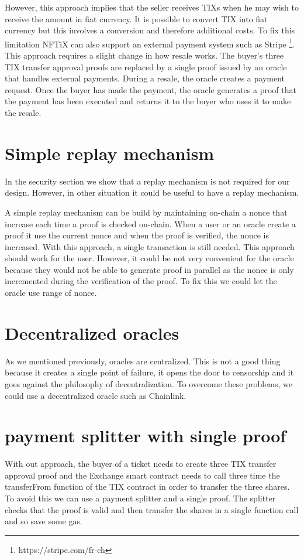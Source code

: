 \documentclass[a4paper,11pt,oneside]{report}
\begin{document}
However, this approach implies that the seller receives TIXs when he may wish to receive the amount in fiat currency. It is possible to convert TIX into fiat currency but this involves a conversion and therefore additional costs. To fix this limitation NFTiX can also support an external payment system such as Stripe \footnote{https://stripe.com/fr-ch}. This approach requires a slight change in how resale works. The buyer's three TIX transfer approval proofs are replaced by a single proof issued by an oracle that handles external payments. During a resale, the oracle creates a payment request. Once the buyer has made the payment, the oracle generates a proof that the payment has been executed and returns it to the buyer who uses it to make the resale.

\section{Simple replay mechanism}
In the security section we show that a replay mechanism is not required for our design. However, in other situation it could be useful to have a replay mechanism. 

A simple replay mechanism can be build by maintaining on-chain a nonce that increase each time a proof is checked on-chain. When a user or an oracle create a proof it use the current nonce and when the proof is verified, the nonce is increased. With this approach, a single transaction is still needed. This approach should work for the user. However, it could be not very convenient for the oracle because they would not be able to generate proof in parallel as the nonce is only incremented during the verification of the proof. To fix this we could let the oracle use range of nonce. 

\section{Decentralized oracles}
As we mentioned previously, oracles are centralized. This is not a good thing because it creates a single point of failure, it opens the door to censorship and it goes against the philosophy of decentralization. To overcome these problems, we could use a decentralized oracle such as Chainlink.

\section{payment splitter with single proof}
With out approach, the buyer of a ticket needs to create three TIX transfer approval proof and the Exchange smart contract needs to call three time the transferFrom function of the TIX contract in order to transfer the three shares. To avoid this we can use a payment splitter and a single proof. The splitter checks that the proof is valid and then transfer the shares in a single function call and so save some gas. 
\end{document}
